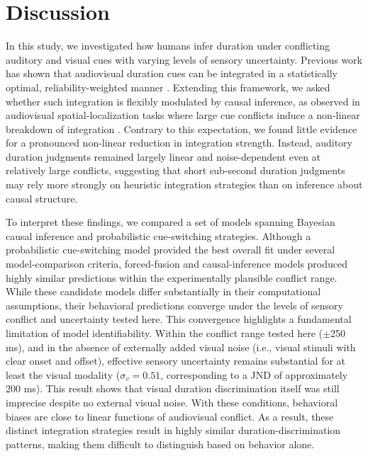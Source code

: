 \documentclass{biorxiv}
\providecommand{\citep}[1]{\cite{#1}}
\begin{document}
\section{Discussion}
In this study, we investigated how humans infer duration under conflicting auditory and visual cues with varying levels of sensory uncertainty. Previous work has shown that audiovisual duration cues can be integrated in a statistically optimal, reliability-weighted manner \citep{shams2005sound,hartcher2014duration}. Extending this framework, we asked whether such integration is flexibly modulated by causal inference, as observed in audiovisual spatial-localization tasks where large cue conflicts induce a non-linear breakdown of integration \citep{kording2007causal, badde2021causal,hong2021causal}. Contrary to this expectation, we found little evidence for a pronounced non-linear reduction in integration strength. Instead, auditory duration judgments remained largely linear and noise-dependent even at relatively large conflicts, suggesting that short sub-second duration judgments may rely more strongly on heuristic integration strategies than on inference about causal structure.
 
To interpret these findings, we compared a set of models spanning Bayesian causal inference and probabilistic cue-switching strategies. Although a probabilistic cue-switching model provided the best overall fit under several model-comparison criteria, forced-fusion and causal-inference models produced highly similar predictions within the experimentally plausible conflict range. While these candidate models differ substantially in their computational assumptions, their behavioral predictions converge under the levels of sensory conflict and uncertainty tested here. This convergence highlights a fundamental limitation of model identifiability. Within the conflict range tested here ($\pm$250 ms), and in the absence of externally added visual noise (i.e., visual stimuli with clear onset and offset), effective sensory uncertainty remains substantial for at least the visual modality ($\sigma_v = 0.51$, corresponding to a JND of approximately 200 ms). This result shows that visual duration discrimination itself was still imprecise despite no external visual noise. With these conditions, behavioral biases are close to linear functions of audiovisual conflict. As a result, these distinct integration strategies result in highly similar duration-discrimination patterns, making them difficult to distinguish based on behavior alone.
\end{document}
